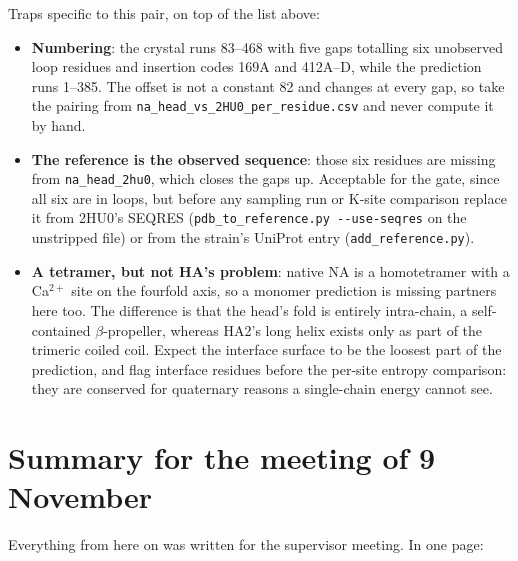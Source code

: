 \documentclass[11pt,a4paper]{article}
\newcommand{\file}[1]{\texttt{#1}}
\begin{document}
Traps specific to this pair, on top of the list above:
\begin{itemize}
  \item \textbf{Numbering}: the crystal runs 83--468 with five gaps totalling six
        unobserved loop residues and insertion codes 169A and 412A--D, while the
        prediction runs 1--385. The offset is not a constant 82 and changes at
        every gap, so take the pairing from
        \file{na\_head\_vs\_2HU0\_per\_residue.csv} and never compute it by hand.
  \item \textbf{The reference is the observed sequence}: those six residues are
        missing from \file{na\_head\_2hu0}, which closes the gaps up. Acceptable
        for the gate, since all six are in loops, but before any sampling run or
        K-site comparison replace it from 2HU0's SEQRES
        (\file{pdb\_to\_reference.py -{}-use-seqres} on the unstripped file) or
        from the strain's UniProt entry (\file{add\_reference.py}).
  \item \textbf{A tetramer, but not HA's problem}: native NA is a homotetramer
        with a Ca$^{2+}$ site on the fourfold axis, so a monomer prediction is
        missing partners here too. The difference is that the head's fold is
        entirely intra-chain, a self-contained $\beta$-propeller, whereas HA2's
        long helix exists only as part of the trimeric coiled coil. Expect the
        interface surface to be the loosest part of the prediction, and flag
        interface residues before the per-site entropy comparison: they are
        conserved for quaternary reasons a single-chain energy cannot see.
\end{itemize}

\clearpage
\section{Summary for the meeting of 9 November}\label{sec:meeting}

Everything from here on was written for the supervisor meeting. In one page:
\end{document}
